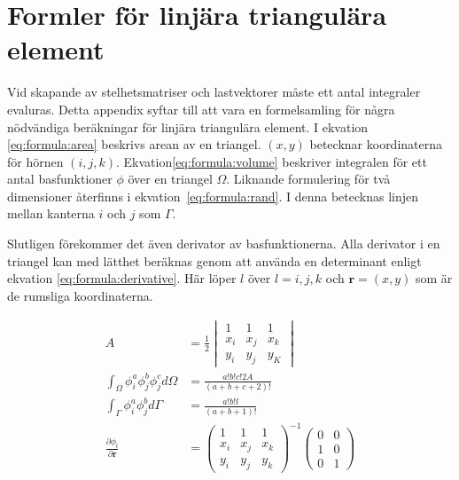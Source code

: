 \chapter{Formler för linjära triangulära element}
\label{sec:integrationformulae}


Vid skapande av stelhetsmatriser och lastvektorer måste ett antal integraler
evaluras. Detta appendix syftar till att vara en formelsamling för några
nödvändiga beräkningar för linjära triangulära element. I ekvation
\eqref{eq:formula:area} beskrivs arean av en triangel. $(x,y)$ betecknar koordinaterna
för hörnen $(i,j,k)$. Ekvation\eqref{eq:formula:volume} beskriver integralen för ett
antal basfunktioner $\phi$ över en triangel $\Omega$. Liknande formulering för två dimensioner
återfinns i ekvation~\eqref{eq:formula:rand}. I denna betecknas linjen mellan kanterna
$i$ och $j$ som $\Gamma$. \cite{lewis04}

Slutligen förekommer det även derivator av basfunktionerna. Alla derivator i en triangel
kan med lätthet beräknas genom att använda en determinant enligt ekvation
\eqref{eq:formula:derivative}. Här löper $l$ över $l=i,j,k$ och $\mathbf{r} = (x,y)$ som är
de rumsliga koordinaterna. \cite{fem50}

\begin{align}
\label{eq:formula:area}
A &=
\frac{1}{2}
\begin{vmatrix}
1 & 1 & 1 \\
x_i & x_j & x_k \\
y_i & y_j & y_K
\end{vmatrix} \\
\label{eq:formula:volume}
\int_\Omega \phi^a_i\phi^b_j\phi^c_j d\Omega &=
\frac{a!b!c!2A}{(a+b+c+2)!} \\
\label{eq:formula:rand}
\int_\Gamma \phi^a_i \phi^b_j d\Gamma &=
\frac{a!b!l}{(a+b+1)!} \\
\label{eq:formula:derivative}
\frac{\partial \phi_l}{\partial \mathbf{r} } &=
\begin{pmatrix}
1 & 1 & 1 \\
x_i & x_j & x_k \\
y_i & y_j & y_k  
\end{pmatrix}^{-1}
\begin{pmatrix}
0 & 0 \\
1 & 0 \\
0 & 1
\end{pmatrix}
\end{align}

